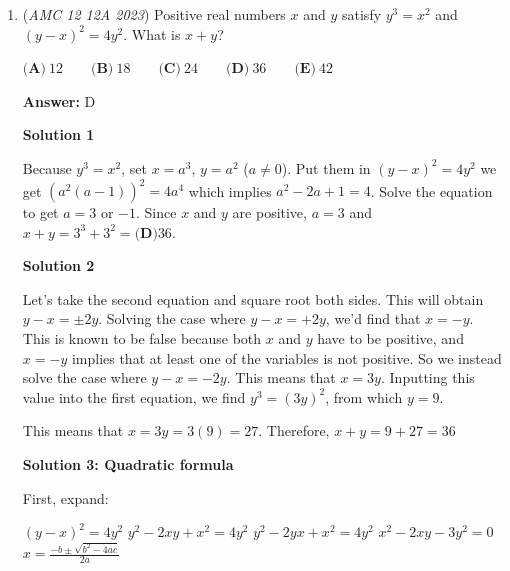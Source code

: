 \begin{enumerate}
 



\textbf{Solution 8}

Let $s$ be the length of the shorter leg, $l$ the longer leg, and $t$ the desired ratio. We have:
 \[s^2+l^2=2 \text{ and } \frac{1}{2}sl=\frac{1}{4}\]The former dividing the latter gives:
 \[t+\frac{1}{t}=4\]Solve this for $t$.Multiply by $t$:
 \[t^2+1=4t\]Subtract -4t to get a quadratic:
 \[t^2-4t+1=0\] Use the quadratic formula to get:
 \[2 \pm \sqrt{3}\]And since the smaller one is the first one, the solution has to be less than 1, so the answer is the one less than 1, the answer is$\boxed{\textbf{(C) }2-\sqrt3}$



	\item (\textit{AMC 12 12A 2023}) Positive real numbers $x$ and $y$ satisfy $y^3 = x^2$ and $(y-x)^2 = 4y^2$. What is $x+y$?


 $\textbf{(A)}\ 12 \qquad \textbf{(B)}\ 18 \qquad \textbf{(C)}\ 24 \qquad \textbf{(D)}\ 36 \qquad \textbf{(E)}\ 42$

 \textbf{Answer: }D



\textbf{Solution 1}

Because $y^3=x^2$, set $x=a^3$, $y=a^2$ ($a\neq 0$). Put them in $(y-x)^2=4y^2$ we get $(a^2(a-1))^2=4a^4$ which implies $a^2-2a+1=4$. Solve the equation to get $a=3$ or $-1$. Since $x$ and $y$ are positive, $a=3$ and $x+y=3^3+3^2=\boxed{\textbf{(D)} 36}$.

 



\textbf{Solution 2}

Let's take the second equation and square root both sides. This will obtain $y-x = \pm2y$. Solving the case where $y-x=+2y$, we'd find that $x=-y$. This is known to be false because both $x$ and $y$ have to be positive, and $x=-y$ implies that at least one of the variables is not positive. So we instead solve the case where $y-x=-2y$. This means that $x=3y$. Inputting this value into the first equation, we find $y^3 = (3y)^2$, from which $y=9$.

 This means that $x=3y=3(9)=27$. Therefore, $x+y=9+27=\boxed{36}$




\textbf{Solution 3: Quadratic formula}

First, expand: 

 $(y-x)^2 = 4y^2$
$y^2-2xy+x^2 = 4y^2$
$y^2-2yx+x^2 = 4y^2$
$x^2-2xy-3y^2 = 0$
$x=\frac{-b\pm\sqrt{b^2-4ac}}{2a}$


\end{enumerate}
